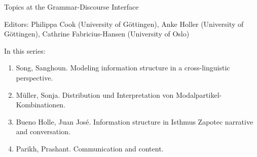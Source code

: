 {\large  Topics at the Grammar-Discourse Interface}

\bigskip

Editors: Philippa Cook (University of Göttingen),
Anke Holler (University of Göttingen),
Cathrine Fabricius-Hansen (University of Oslo)

\bigskip

In this series:

\begin{enumerate}
\item Song, Sanghoun. Modeling information structure in a cross-linguistic perspective.
\item Müller, Sonja. Distribution und Interpretation von Modalpartikel-Kombinationen.
\item Bueno Holle, Juan José. Information structure in Isthmus Zapotec narrative and conversation.
\item Parikh, Prashant. Communication and content.
\end{enumerate}

